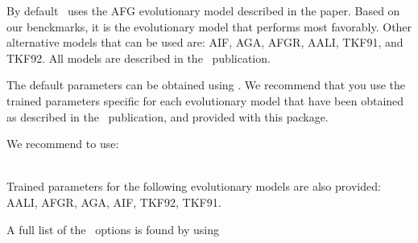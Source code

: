 \begin{sreitems}{}
\item[\emprog{Evolutionary model:}] By default \etwomsa\ uses the AFG evolutionary model described in the paper.
  Based on our benckmarks, it is the evolutionary model that performs most favorably.
  Other alternative models that can be used are: AIF, AGA, AFGR, AALI, TKF91, and TKF92. All models are described
  in the \etwomsa\ publication.
  
\item[\emprog{Model parameters:}] The default parameters can be obtained using .
  We recommend that you use the trained parameters specific for each evolutionary model that have been
  obtained as described in the  \etwomsa\ publication, and provided with this package.

  We recommend to use:
  
  \\

  Trained parameters for the following evolutionary models are also provided: AALI, AFGR, AGA, AIF, TKF92, TKF91.

\end{sreitems}

 A full list of the \etwomsa\ options is found by using


 
